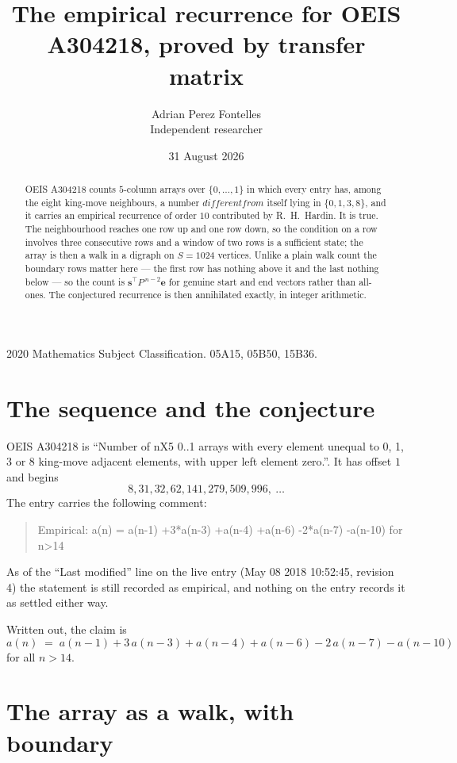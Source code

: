 \documentclass[11pt,a4paper]{article}
\title{The empirical recurrence for OEIS A304218, proved by transfer matrix}
\author{Adrian Perez Fontelles\\ \small Independent researcher}
\date{31 August 2026}
\theoremstyle{plain}
\theoremstyle{definition}
\begin{document}
\maketitle

\begin{abstract}
OEIS A304218 counts $5$-column arrays over $\{0,\dots,1\}$ in which every entry has,
among the eight king-move neighbours, a number $different from$ itself lying in $\{0,1,3,8\}$, and it carries an empirical
recurrence of order $10$ contributed by R.~H.~Hardin. It is true. The neighbourhood
reaches one row up and one row down, so the condition on a row involves three consecutive
rows and a window of two rows is a sufficient state; the array is then a walk in a digraph
on $S=1024$ vertices. Unlike a plain walk count the boundary rows matter here --- the first
row has nothing above it and the last nothing below --- so the count is
$\mathbf{s}^{\!\top}P^{\,n-2}\mathbf{e}$ for genuine start and end vectors rather than
all-ones. The conjectured recurrence is then annihilated exactly, in integer arithmetic.
\end{abstract}

\noindent\small 2020 Mathematics Subject Classification. 05A15, 05B50, 15B36.\normalsize

\section{The sequence and the conjecture}

OEIS A304218 is ``Number of nX5 0..1 arrays with every element unequal to 0, 1, 3 or 8 king-move adjacent elements, with upper left element zero.''. It has offset
$1$ and begins
\[
8, 31, 32, 62, 141, 279, 509, 996,\ \dots
\]
The entry carries the following comment:
\begin{quote}\small
Empirical: a(n) = a(n-1) +3*a(n-3) +a(n-4) +a(n-6) -2*a(n-7) -a(n-10) for n>14
\end{quote}
As of the ``Last modified'' line on the live entry (May 08 2018 10:52:45, revision
4) the statement is still recorded as empirical, and nothing on the entry
records it as settled either way.

Written out, the claim is
\begin{equation}\label{eq:conj}
a(n)\;=\;a(n-1) + 3\,a(n-3) + a(n-4) + a(n-6) - 2\,a(n-7) - a(n-10)
\end{equation}
for all $n>14$.

\section{The array as a walk, with boundary}
\end{document}
